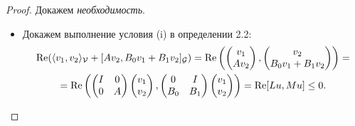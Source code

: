 \smallskip

\begin{proof} Докажем \emph{необходимость}.

\begin{itemize}

\item[(i)] Докажем выполнение условия (i) в определении 2.2:
\begin{multline*}
\mathop{\rm Re}(\langle v_{1},v_{2}\rangle_{\mathcal
V}+[Av_{2},B_{0}v_{1}+B_{1}v_{2}]_{\mathcal G})=
\mathop{\rm Re}\left(\begin{pmatrix}
v_{1}\\Av_{2}\end{pmatrix},\begin{pmatrix}
v_{2}\\B_{0}v_{1}+B_{1}v_{2}\end{pmatrix}\right)=
\\
=\mathop{\rm Re}\left(\begin{pmatrix}
I&0\\0&A\end{pmatrix}\begin{pmatrix}v_{1}\\v_{2}\end{pmatrix}
,\begin{pmatrix}
0&I\\B_{0}&B_{1}\end{pmatrix}\begin{pmatrix}v_{1}\\v_{2}\end{pmatrix}\right)=\mathop{\rm Re}[Lu,Mu]\leq 0.
\end{multline*}


\end{itemize}
\end{proof}
